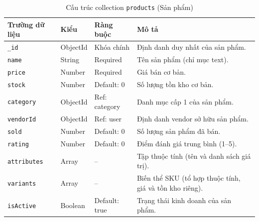 \documentclass[../DoAn.tex]{subfiles}
\begin{document}
\begin{table}[H]
    \centering
    \caption{Cấu trúc collection \texttt{products} (Sản phẩm)}
    \label{table:schema_product}
    \small
    \setlength{\tabcolsep}{3pt}
    \begin{tabular}{|>{\raggedright\arraybackslash}p{3.0cm}|>{\raggedright\arraybackslash}p{1.7cm}|>{\raggedright\arraybackslash}p{2.6cm}|>{\raggedright\arraybackslash}p{5.3cm}|}
        \hline
        \textbf{Trường dữ liệu} & \textbf{Kiểu} & \textbf{Ràng buộc} & \textbf{Mô tả} \\ \hline
        \texttt{\_id} & ObjectId & Khóa chính & Định danh duy nhất của sản phẩm. \\ \hline
        \texttt{name} & String & Required & Tên sản phẩm (chỉ mục text). \\ \hline
        \texttt{price} & Number & Required & Giá bán cơ bản. \\ \hline
        \texttt{stock} & Number & Default: 0 & Số lượng tồn kho cơ bản. \\ \hline
        \texttt{category} & ObjectId & Ref: category & Danh mục cấp 1 của sản phẩm. \\ \hline
        \texttt{vendorId} & ObjectId & Ref: user & Định danh vendor sở hữu sản phẩm. \\ \hline
        \texttt{sold} & Number & Default: 0 & Số lượng sản phẩm đã bán. \\ \hline
        \texttt{rating} & Number & Default: 0 & Điểm đánh giá trung bình (1--5). \\ \hline
        \texttt{attributes} & Array & -- & Tập thuộc tính (tên và danh sách giá trị). \\ \hline
        \texttt{variants} & Array & -- & Biến thể SKU (tổ hợp thuộc tính, giá và tồn kho riêng). \\ \hline
        \texttt{isActive} & Boolean & Default: true & Trạng thái kinh doanh của sản phẩm. \\ \hline
    \end{tabular}
\end{table}
\end{document}
